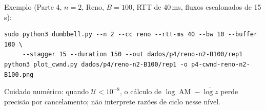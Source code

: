 \documentclass[11pt,a4paper]{article}
\newcommand{\AM}{\operatorname{AM}}
\begin{document}
Exemplo (Parte 4, $n=2$, Reno, $B=100$, RTT de 40\,ms, fluxos escalonados de 15\,s):
\begin{lstlisting}[style=sh]
sudo python3 dumbbell.py --n 2 --cc reno --rtt-ms 40 --bw 10 --buffer 100 \
     --stagger 15 --duration 150 --out dados/p4/reno-n2-B100/rep1
python3 plot_cwnd.py dados/p4/reno-n2-B100/rep1 -o p4-cwnd-reno-n2-B100.png
\end{lstlisting}
Cuidado numérico: quando $\mathcal U<10^{-8}$, o cálculo de $\log\AM-\overline{\log z}$
perde precisão por cancelamento; não interprete razões de ciclo nesse nível.
\end{document}
